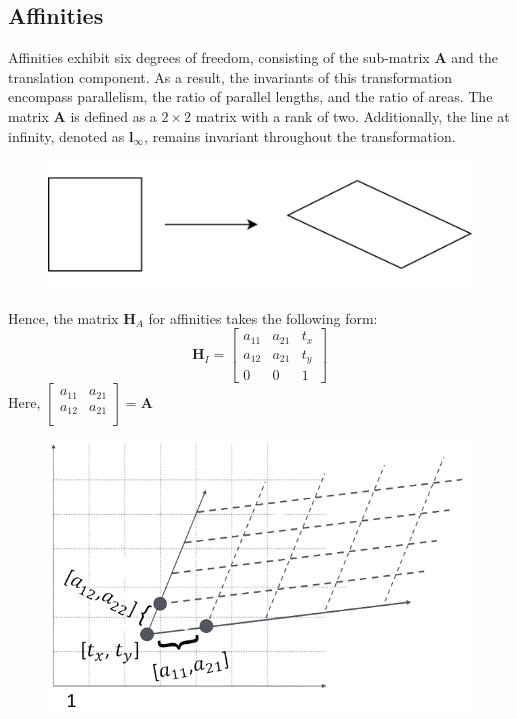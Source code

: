 \subsection{Affinities}
Affinities exhibit six degrees of freedom, consisting of the sub-matrix $\mathbf{A}$ and the translation component. 
As a result, the invariants of this transformation encompass parallelism, the ratio of parallel lengths, and the ratio of areas. 
The matrix $\mathbf{A}$ is defined as a $2 \times 2$ matrix with a rank of two. 
Additionally, the line at infinity, denoted as $\mathbf{l}_{\infty}$, remains invariant throughout the transformation.
\begin{figure}[H]
    \centering
    \includegraphics[width=0.25\linewidth]{images/affinities.png}
\end{figure}
Hence, the matrix $\mathbf{H}_A$ for affinities takes the following form:
\[\mathbf{H}_I=
\begin{bmatrix}
    a_{11} & a_{21} & t_x \\
    a_{12} & a_{21} & t_y \\
    0 & 0 & 1
\end{bmatrix}\]
Here, $
\begin{bmatrix}
    a_{11} & a_{21} \\
    a_{12} & a_{21} \\
\end{bmatrix}
=\mathbf{A}$
\begin{figure}[H]
    \centering
    \includegraphics[width=0.3\linewidth]{images/affinities1.png}
\end{figure}


